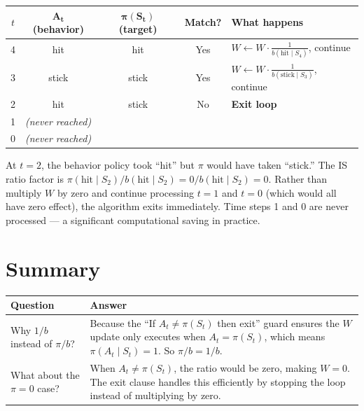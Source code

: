 \documentclass[11pt]{article}
\begin{document}
\begin{table}[H]
    \centering
    \begin{tabular}{ccccl}
        \toprule
        \textbf{$t$} & $\boldsymbol{A_t}$ \textbf{(behavior)} & $\boldsymbol{\pi(S_t)}$ \textbf{(target)} & \textbf{Match?} & \textbf{What happens} \\
        \midrule
        4 & hit & hit & Yes & $W \leftarrow W \cdot \frac{1}{b(\text{hit} \mid S_4)}$, continue \\
        3 & stick & stick & Yes & $W \leftarrow W \cdot \frac{1}{b(\text{stick} \mid S_3)}$, continue \\
        2 & hit & stick & No & \textbf{Exit loop} \\
        1 & \multicolumn{4}{l}{\textit{(never reached)}} \\
        0 & \multicolumn{4}{l}{\textit{(never reached)}} \\
        \bottomrule
    \end{tabular}
\end{table}

At $t = 2$, the behavior policy took ``hit'' but $\pi$ would have taken ``stick.'' The IS ratio factor is $\pi(\text{hit} \mid S_2) / b(\text{hit} \mid S_2) = 0 / b(\text{hit} \mid S_2) = 0$. Rather than multiply $W$ by zero and continue processing $t = 1$ and $t = 0$ (which would all have zero effect), the algorithm exits immediately. Time steps 1 and 0 are never processed --- a significant computational saving in practice.

\section*{Summary}

\begin{table}[ht]
    \centering
    \begin{tabular}{p{} p{}}
        \toprule
        \textbf{Question} & \textbf{Answer} \\
        \midrule
        Why $1/b$ instead of $\pi/b$? & Because the ``If $A_t \neq \pi(S_t)$ then exit'' guard ensures the $W$ update only executes when $A_t = \pi(S_t)$, which means $\pi(A_t \mid S_t) = 1$. So $\pi/b = 1/b$. \\
        \addlinespace
        What about the $\pi = 0$ case? & When $A_t \neq \pi(S_t)$, the ratio would be zero, making $W = 0$. The exit clause handles this efficiently by stopping the loop instead of multiplying by zero. \\
        \bottomrule
    \end{tabular}
\end{table}
\end{document}
